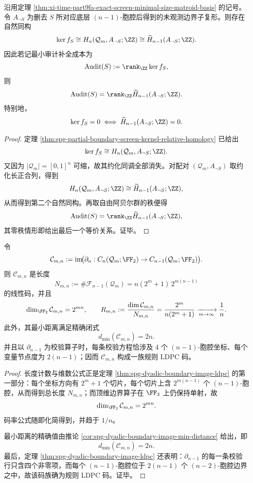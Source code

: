 \begin{theorem}[屏幕核由未观测边界子复形的顶维约化同调完全刻画]\label{thm:xi-time-part9fa-screen-kernel-top-homology}
沿用定理 \ref{thm:xi-time-part9fa-exact-screen-minimal-size-matroid-basis} 的记号。令 \(A_{\neg S}\) 为删去 \(S\) 所对应底层 \((n-1)\)-胞腔后得到的未观测边界子复形。则存在自然同构
\[
\ker f_S
\cong
H_n(\mathcal Q_m,A_{\neg S};\ZZ)
\cong
\widetilde H_{n-1}(A_{\neg S};\ZZ).
\]
因此若记最小审计补全成本为
\[
\mathrm{Audit}(S):=\rank_{\ZZ}\ker f_S,
\]
则
\[
\mathrm{Audit}(S)=\rank_{\ZZ}\widetilde H_{n-1}(A_{\neg S};\ZZ).
\]
特别地，
\[
\ker f_S=0
\iff
\widetilde H_{n-1}(A_{\neg S};\ZZ)=0.
\]
\end{theorem}
\begin{proof}
定理 \ref{thm:spg-partial-boundary-screen-kernel-relative-homology} 已给出
\[
\ker f_S\cong H_n(\mathcal Q_m,A_{\neg S};\ZZ).
\]
又因为 \(|\mathcal Q_m|=[0,1]^n\) 可缩，故其约化同调全部消失。对配对 \((\mathcal Q_m,A_{\neg S})\) 取约化长正合列，得到
\[
H_n(\mathcal Q_m,A_{\neg S};\ZZ)\cong \widetilde H_{n-1}(A_{\neg S};\ZZ),
\]
从而得到第二个自然同构。再取自由阿贝尔群的秩便得
\[
\mathrm{Audit}(S)=\rank_{\ZZ}\widetilde H_{n-1}(A_{\neg S};\ZZ),
\]
其零秩情形即给出最后一个等价关系。证毕。
\end{proof}

\begin{theorem}\label{thm:xi-time-part9fa-dyadic-boundary-image-ldpc}
令
\[
\mathcal C_{m,n}
:=
\operatorname{im}\!\bigl(
\partial_n:
C_n(\mathcal Q_m;\FF_2)\to C_{n-1}(\mathcal Q_m;\FF_2)
\bigr).
\]
则 \(\mathcal C_{m,n}\) 是长度
\[
N_{m,n}
:=
\#\mathcal F_{n-1}(\mathcal Q_m)
=
n(2^m+1)\,2^{m(n-1)}
\]
的线性码，并且
\[
\dim_{\FF_2}\mathcal C_{m,n}=2^{mn},
\qquad
R_{m,n}:=\frac{\dim \mathcal C_{m,n}}{N_{m,n}}
=
\frac{2^m}{n(2^m+1)}
\xrightarrow[m\to\infty]{}
\frac1n.
\]
此外，其最小距离满足精确闭式
\[
d_{\min}(\mathcal C_{m,n})=2n.
\]
并且以 \(\partial_{n-1}\) 为校验算子时，每条校验方程恰涉及 \(4\) 个 \((n-1)\)-胞腔坐标、每个变量节点度为 \(2(n-1)\)；因而 \(\mathcal C_{m,n}\) 构成一族规则 LDPC 码。
\end{theorem}
\begin{proof}
长度计数与维数公式正是定理 \ref{thm:spg-dyadic-boundary-image-ldpc} 的第一部分：每个坐标方向有 \(2^m+1\) 个切片，每个切片上含 \(2^{m(n-1)}\) 个 \((n-1)\)-胞腔，从而得到总长度 \(N_{m,n}\)；而顶维边界算子在 \(\FF_2\) 上仍保持单射，故
\[
\dim_{\FF_2}\mathcal C_{m,n}=2^{mn}.
\]
码率公式随即化简得到，并趋于 \(1/n\)。

最小距离的精确值由推论 \ref{cor:spg-dyadic-boundary-image-min-distance} 给出，即
\[
d_{\min}(\mathcal C_{m,n})=2n.
\]
最后，定理 \ref{thm:spg-dyadic-boundary-image-ldpc} 还表明：\(\partial_{n-1}\) 的每一条校验行只含四个非零项，而每个 \((n-1)\)-胞腔位于 \(2(n-1)\) 个 \((n-2)\)-胞腔边界之中，故该码族确为规则 LDPC 码。证毕。
\end{proof}

